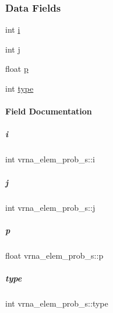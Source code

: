 \subsubsection*{Data Fields}
\begin{DoxyCompactItemize}
\item 
int \mbox{\hyperlink{group__struct__utils_a0f8bb11ded4e605f816d7ad92eb568f6}{i}}
\item 
int \mbox{\hyperlink{group__struct__utils_acada5be62ed6843334a918ca543f0c0d}{j}}
\item 
float \mbox{\hyperlink{group__struct__utils_a9c09385582d8a7ab00485181f4e868b7}{p}}
\item 
int \mbox{\hyperlink{group__struct__utils_a11715ffa51cb6277db7ebd3d9170d691}{type}}
\end{DoxyCompactItemize}


\paragraph{Field Documentation}
\mbox{\label{group__struct__utils_a0f8bb11ded4e605f816d7ad92eb568f6}} 
\subparagraph{\texorpdfstring{i}{i}}
{\footnotesize\ttfamily int vrna\+\_\+elem\+\_\+prob\+\_\+s\+::i}

\mbox{\label{group__struct__utils_acada5be62ed6843334a918ca543f0c0d}} 
\subparagraph{\texorpdfstring{j}{j}}
{\footnotesize\ttfamily int vrna\+\_\+elem\+\_\+prob\+\_\+s\+::j}

\mbox{\label{group__struct__utils_a9c09385582d8a7ab00485181f4e868b7}} 
\subparagraph{\texorpdfstring{p}{p}}
{\footnotesize\ttfamily float vrna\+\_\+elem\+\_\+prob\+\_\+s\+::p}

\mbox{\label{group__struct__utils_a11715ffa51cb6277db7ebd3d9170d691}} 
\subparagraph{\texorpdfstring{type}{type}}
{\footnotesize\ttfamily int vrna\+\_\+elem\+\_\+prob\+\_\+s\+::type}



